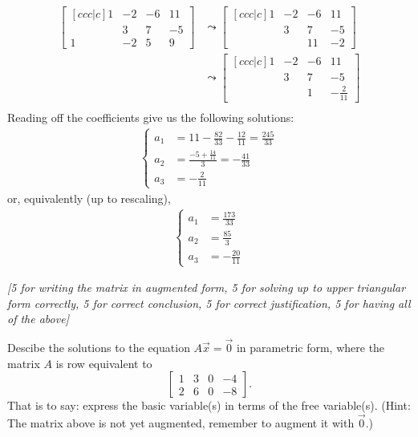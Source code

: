 \documentclass[answers,11pt]{exam}
\theoremstyle{definition}
\theoremstyle{definition}
\DeclareMathOperator{\1}{\mathbbm{1}}
\begin{document}
\begin{questions}
\begin{solution}
	\begin{align*}
	\begin{bmatrix}[c c c | c]
	1 & -2 & -6 & 11 \\ & 3 & 7 & -5 \\ 1 & -2 & 5 & 9
	\end{bmatrix} & \leadsto \begin{bmatrix}[c c c | c]
	1 & -2 & -6 & 11 \\ & 3 & 7 & -5 \\  &  & 11 & -2
	\end{bmatrix} \\
	&\leadsto \begin{bmatrix}[c c c | c]
	1 & -2 & -6 & 11 \\ & 3 & 7 & -5 \\  &  & 1 & -\frac{2}{11}
	\end{bmatrix} \\
	\end{align*}
	Reading off the coefficients give us the following solutions:
	\begin{align*}
	\begin{cases}
	a_1 &= 11 - \frac{82}{33} - \frac{12}{11} =  \frac{245}{33} \\
	a_2 &= \frac{-5 + \frac{14}{11}}{3} = -\frac{41}{33} \\
	a_3 &= -\frac{2}{11}
	\end{cases}
	\end{align*}
	or, equivalently (up to rescaling),
	\begin{align*}
	\begin{cases}
	a_1 &= \frac{173}{33} \\
	a_2 &= \frac{85}{3} \\
	a_3 &= -\frac{20}{11}
	\end{cases}
	\end{align*}
	
	
	\textit{[5 for writing the matrix in augmented form, 5 for solving up to upper triangular form \textit{correctly}, 5 for correct conclusion, 5 for correct justification, 5 for having all of the above]}
\end{solution}

\question[25] Descibe the solutions to the equation $A\vec{x}=\vec{0}$ in parametric form, where the matrix $A$ is row equivalent to 
\begin{equation*}
\begin{bmatrix}
1&3&0&-4\\
2&6&0&-8
\end{bmatrix}.
\end{equation*}
That is to say: express the basic variable(s) in terms of the free variable(s). (Hint: The matrix above is not yet augmented, remember to augment it with $\vec{0}$.)
\addpoints



\end{questions}
\end{document}
